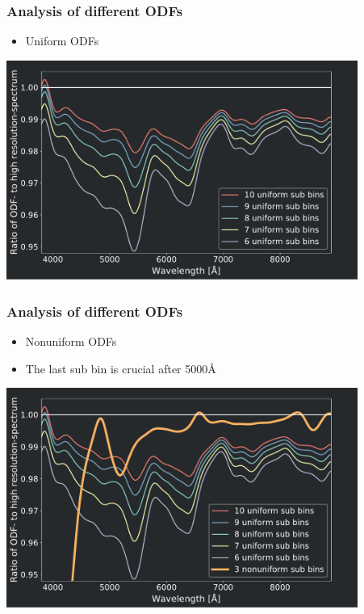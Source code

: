 \frame
{
	\frametitle{Analysis of different ODFs}
	\begin{itemize}
	\item Uniform ODFs
	\end{itemize}
	
	\centering
	\includegraphics[width=115mm]{images/6_10_vs_best_4_0}
}
\frame
{
	\frametitle{Analysis of different ODFs}
	\begin{itemize}
		\item Nonuniform ODFs
		\item The last sub bin is crucial after 5000\si{\angstrom}
    \end{itemize}	  
	\centering
	\includegraphics[width=115mm]{images/6_10_vs_best_4_1}
}
